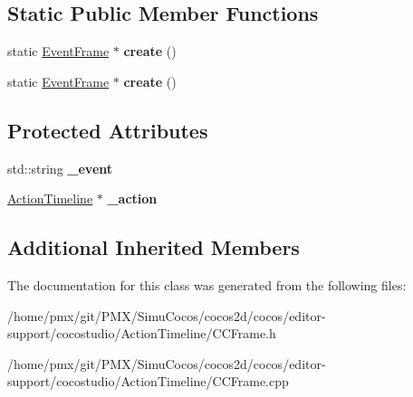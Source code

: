 \subsection*{Static Public Member Functions}
\begin{DoxyCompactItemize}
\item 
\mbox{\label{classEventFrame_a40639e511126f489dcea046782f83b70}} 
static \hyperlink{classEventFrame}{Event\+Frame} $\ast$ {\bfseries create} ()
\item 
\mbox{\label{classEventFrame_a518776a20bb4a57fadc50387324918c3}} 
static \hyperlink{classEventFrame}{Event\+Frame} $\ast$ {\bfseries create} ()
\end{DoxyCompactItemize}
\subsection*{Protected Attributes}
\begin{DoxyCompactItemize}
\item 
\mbox{\label{classEventFrame_acb0f8252c2e2b95282d78d4dcce61eca}} 
std\+::string {\bfseries \+\_\+event}
\item 
\mbox{\label{classEventFrame_ac149f2f5b80017523b137d5df3eded02}} 
\hyperlink{classActionTimeline}{Action\+Timeline} $\ast$ {\bfseries \+\_\+action}
\end{DoxyCompactItemize}
\subsection*{Additional Inherited Members}


The documentation for this class was generated from the following files\+:\begin{DoxyCompactItemize}
\item 
/home/pmx/git/\+P\+M\+X/\+Simu\+Cocos/cocos2d/cocos/editor-\/support/cocostudio/\+Action\+Timeline/C\+C\+Frame.\+h\item 
/home/pmx/git/\+P\+M\+X/\+Simu\+Cocos/cocos2d/cocos/editor-\/support/cocostudio/\+Action\+Timeline/C\+C\+Frame.\+cpp\end{DoxyCompactItemize}
